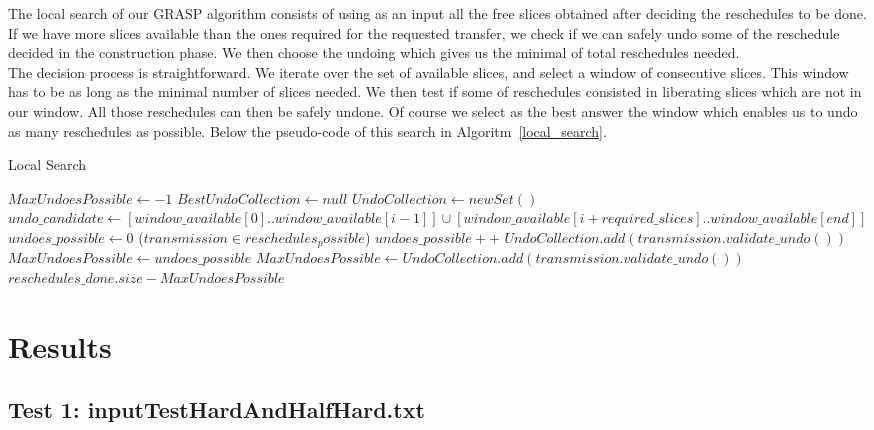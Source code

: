 \documentclass[11pt,a4paper]{article}
\begin{document}
The local search of our GRASP algorithm consists of using as an input all the free slices obtained after deciding the reschedules to be done. If we have more slices available than the ones required for the requested transfer, we check if we can safely undo some of the reschedule decided in the construction phase. We then choose the undoing which gives us the minimal of total reschedules needed.\\

The decision process is straightforward. We iterate over the set of available slices, and select a window of consecutive slices. This window has to be as long as the minimal number of slices needed. We then test if some of reschedules consisted in liberating slices which are not in our window. All those reschedules can then be safely undone. Of course we select as the best answer the window which enables us to undo as many reschedules as possible. Below the pseudo-code of this search in Algoritm~\ref{local_search}.\\ 

\begin{algorithm}[H]
\caption{Local Search}\label{local_search}
\begin{algorithmic}[1]
	\State $MaxUndoesPossible \gets -1$
	\State $BestUndoCollection \gets null$
		\State $UndoCollection \gets new Set()$
		\State $undo\_candidate \gets [window\_available[0]..window\_available[i-1]] \cup [window\_available[i+required\_slices]..window\_available[end]]$
		\State $undoes\_possible\gets 0$
		\ForAll($transmission \in reschedules_possible$)
				\State $undoes\_possible++$
				\State $UndoCollection.add(transmission.validate\_undo())$
			\EndIf
		\EndFor
			\State $MaxUndoesPossible \gets undoes\_possible$
			\State $MaxUndoesPossible \gets UndoCollection.add		(transmission.validate\_undo())$
		\EndIf
	\EndFor
	\State \Return $reschedules\_done.size - MaxUndoesPossible$
\EndProcedure
\end{algorithmic}
\end{algorithm}

\section{Results}

\subsection{Test 1: inputTestHardAndHalfHard.txt}
\end{document}
